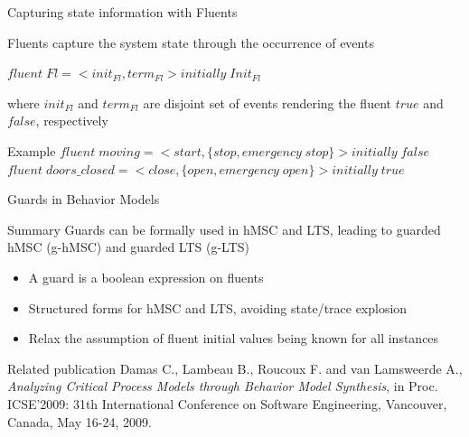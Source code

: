 \begin{frame}{Capturing state information with Fluents}
  \begin{block}{Fluents capture the system state through the occurrence of events \cite{Milner89}}
	  \begin{center}
		  $fluent\;Fl = <init_{Fl}, term_{Fl}> initially\;Init_{Fl}$
	  \end{center}
	  \vspace{-0.4cm}
	  where $init_{Fl}$ and $term_{Fl}$ are disjoint set of events rendering the fluent $true$ and $false$, respectively
  \end{block}
  \begin{block}{Example}
	  \small
	  $fluent\;moving = <start, \{stop, emergency\;stop\}> initially\;false$
	  $fluent\;doors\_closed = <close, \{open, emergency\;open\}> initially\;true$
  \end{block}
\end{frame}

\begin{frame}{Guards in Behavior Models}
  \small
  \begin{block}{Summary}
	  Guards can be formally used in hMSC and LTS, leading to guarded hMSC (g-hMSC) and guarded LTS (g-LTS)
	  \begin{itemize}
	         \item A guard is a boolean expression on fluents
	         \item Structured forms for hMSC and LTS, avoiding state/trace explosion
	         \item Relax the assumption of fluent initial values being known for all instances
	  \end{itemize}
  \end{block}
  \begin{block}{Related publication}
	  \scriptsize
	  Damas C., Lambeau B., Roucoux F. and van Lamsweerde A., \emph{Analyzing Critical Process Models through Behavior Model Synthesis},
	  in Proc. ICSE'2009: 31th International Conference on Software Engineering, Vancouver, Canada, May 16-24, 2009. 
  \end{block}
\end{frame}

